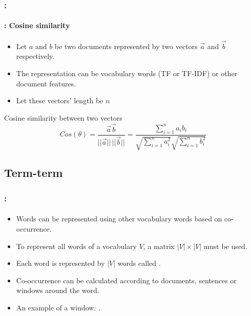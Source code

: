 \documentclass[xcolor=table]{beamer}
\begin{document}
\begin{frame}
	\frametitle{\insertshortsubtitle: \insertsection}
	\framesubtitle{\insertsubsection: Cosine similarity}

	\begin{minipage}{.68\textwidth}
	\begin{itemize}
		\item Let $a$ and $b$ be two documents represented by two vectors $\overrightarrow{a}$ and $\overrightarrow{b}$ respectively.
		\item The representation can be vocabulary words (TF or TF-IDF) or other document features.
		\item Let these vectors' length be $n$
	\end{itemize}
	\end{minipage}
	\begin{minipage}{.3\textwidth}
	\end{minipage}
	
	\begin{block}{Cosine similarity between two vectors}
		\[
		Cos(\theta) = \frac{\overrightarrow{a} \overrightarrow{b}}{||\overrightarrow{a}||\, ||\overrightarrow{b}||}
		= \frac{\sum_{i=1}^{n} a_i b_i}{\sqrt{\sum_{i=1}^{n} a_i^2} \sqrt{\sum_{i=1}^{n} b_i^2}}
		\]
	\end{block}

\end{frame}

\subsection{Term-term}

\begin{frame}
	\frametitle{\insertshortsubtitle: \insertsection}
	\framesubtitle{\insertsubsection}

	\begin{itemize}
		\item Words can be represented using other vocabulary words based on co-occurrence.
		\item To represent all words of a vocabulary $ V $, a matrix $|V| \times |V|$ must be used.
		\item Each word is represented by $|V|$ words called .
		\item Co-occurrence can be calculated according to documents, sentences or windows around the word.
		\item An example of a window: .
	\end{itemize}

\end{frame}
\end{document}
